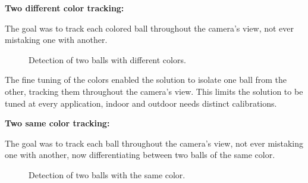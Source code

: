 \documentclass[10pt,twocolumn,letterpaper]{article}
\begin{document}
  \bigbreak{}
  \textbf{Two different color tracking:}
  \bigbreak{}

  The goal was to track each colored ball throughout the camera's view, not ever
  mistaking one with another.

  \begin{figure}[!h]
    \centering
    \setlength{\fboxsep}{1pt}
    \setlength{\fboxrule}{1pt}
    \caption{Detection of two balls with different colors.}\label{fig:diff_color}
  \end{figure}

  The fine tuning of the colors enabled the solution to isolate one ball from
  the other, tracking them throughout the camera's view. This limits the
  solution to be tuned at every application, indoor  and outdoor needs
  distinct calibrations.

  \bigbreak{}
  \textbf{Two same color tracking:}
  \bigbreak{}

  The goal was to track each ball throughout the camera's view, not ever
  mistaking one with another, now differentiating between two balls of the same
  color.

  \begin{figure}[!h]
    \centering
    \setlength{\fboxsep}{1pt}
    \setlength{\fboxrule}{1pt}
    \caption{Detection of two balls with the same color.}\label{fig:same_color}
  \end{figure}
\end{document}
